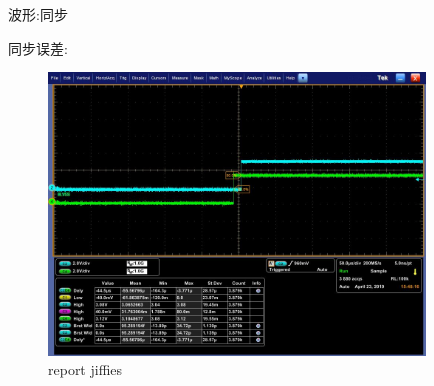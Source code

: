 \begin{frame}[fragile]{波形:同步}

同步误差:

  \begin{figure}[htbp]
  \begin{center}
  \includegraphics[width=10cm]{img/mis1}
  \caption{report jiffies}
  \label{report}
  \end{center}
  \vspace{-0.5em}
  \end{figure}


\end{frame}


